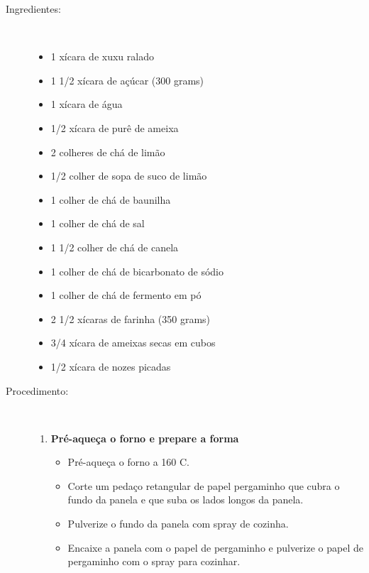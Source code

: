 \documentclass [11pt, letterpaper] {article}
\begin{document}
\begin {description}

\item [Ingredientes:] \ \\
\begin {itemize}
\item 1 xícara de xuxu ralado
\item 1 1/2 xícara de açúcar (300 grams)
\item 1 xícara de água
\item 1/2 xícara de purê de ameixa
\item 2 colheres de chá de limão
\item 1/2 colher de sopa de suco de limão
\item 1 colher de chá de baunilha
\item 1 colher de chá de sal
\item 1 1/2 colher de chá de canela
\item 1 colher de chá de bicarbonato de sódio
\item 1 colher de chá de fermento em pó
\item 2 1/2 xícaras de farinha (350 grams)
\item 3/4 xícara de ameixas secas em cubos
\item 1/2 xícara de nozes picadas
\end {itemize}

\item [Procedimento:] \ \\

\begin {enumerate}
\item {\bf Pré-aqueça o forno e prepare a forma}
\begin {itemize}
\item Pré-aqueça o forno a 160 C.
\item Corte um pedaço retangular de papel pergaminho que cubra o fundo da panela e que suba os lados longos da panela.
\item Pulverize o fundo da panela com spray de cozinha.
\item Encaixe a panela com o papel de pergaminho e pulverize o papel de pergaminho com o spray para cozinhar.
\end {itemize}


\end{enumerate}
\end{description}
\end{document}
